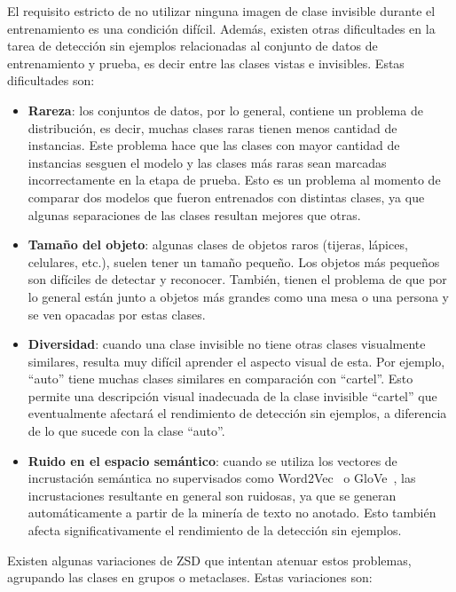 El requisito estricto de no utilizar ninguna imagen de clase invisible durante el entrenamiento es una condición difícil. Además, existen otras dificultades en la tarea de detección sin ejemplos relacionadas al conjunto de datos de entrenamiento y prueba, es decir entre las clases vistas e invisibles. Estas dificultades son:

\begin{itemize}
	\item \textbf{Rareza}: los conjuntos de datos, por lo general, contiene un problema de distribución, es decir, muchas clases raras tienen menos cantidad de instancias. Este problema hace que las clases con mayor cantidad de instancias sesguen el modelo y las clases más raras sean marcadas incorrectamente en la etapa de prueba. Esto es un problema al momento de comparar dos modelos que fueron entrenados con distintas clases, ya que algunas separaciones  de las clases resultan mejores que otras.

	\item \textbf{Tamaño del objeto}: algunas clases de objetos raros (tijeras, lápices, celulares, etc.), suelen tener un tamaño pequeño. Los objetos más pequeños son difíciles de detectar y reconocer. También, tienen el problema de que por lo general están junto a objetos más grandes como una mesa o una persona y se ven opacadas por estas clases.

	\item \textbf{Diversidad}: cuando una clase invisible no tiene otras clases visualmente similares, resulta muy difícil aprender el aspecto visual de esta. Por ejemplo, ``auto'' tiene muchas clases similares en comparación con ``cartel''. Esto permite una descripción visual inadecuada de la clase invisible ``cartel'' que eventualmente afectará el rendimiento de detección sin ejemplos, a diferencia de lo que sucede con la clase ``auto''.

	\item \textbf{Ruido en el espacio semántico}: cuando se utiliza los vectores de incrustación semántica no supervisados como Word2Vec~\cite{mikolov2013distributed} o GloVe~\cite{pennington2014glove}, las incrustaciones resultante en general son ruidosas, ya que se generan automáticamente a partir de la minería de texto no anotado. Esto también afecta significativamente el rendimiento de la detección sin ejemplos.
\end{itemize}

Existen algunas variaciones de ZSD que intentan atenuar estos problemas, agrupando las clases en grupos o metaclases. Estas variaciones son: 

